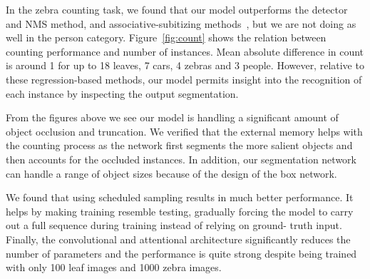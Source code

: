 In the zebra counting task, we found that our model outperforms the detector
and NMS method, and associative-subitizing methods~\cite{chattopadhyay16count},
but we are not doing as well in the person category. Figure~\ref{fig:count}
shows the relation between counting performance and number of instances. Mean
absolute difference in count is around 1 for up to 18 leaves, 7 cars, 4 zebras
and 3 people. However, relative to these regression-based methods,  our model
permits insight into the recognition of each instance by inspecting the output
segmentation.

From the figures above we see our model is handling a significant amount of
object occlusion and truncation. We verified that the external memory helps
with the counting process as the network first segments the more salient
objects and then accounts for the occluded instances. In addition, our
segmentation network can handle a range of object sizes because of the
design of the box network.

We found that using scheduled sampling results in much better performance. It
helps by making training resemble testing, gradually forcing the model
to carry out a full sequence during training instead of relying on ground-
truth input. Finally, the convolutional and attentional architecture
significantly reduces the number of parameters and the performance is quite
strong despite being trained with only 100 leaf images and 1000 zebra images.



